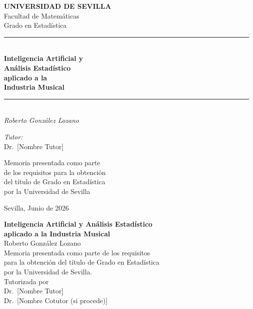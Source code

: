 \documentclass[12pt, a4paper, twoside]{book}
\theoremstyle{definition}
\begin{document}
\frontmatter

\begin{titlepage}
\centering
\vspace*{1.5cm}

{\large\bfseries UNIVERSIDAD DE SEVILLA}\\[0.3cm]
{\large Facultad de Matemáticas}\\[0.2cm]
{\large Grado en Estadística}\\[2cm]

\rule{\textwidth}{1.5pt}\\[0.5cm]
{\Huge\bfseries\color{azultfg}
Inteligencia Artificial y\\[0.3cm]
Análisis Estadístico\\[0.3cm]
aplicado a la\\[0.3cm]
Industria Musical}\\[0.4cm]
\rule{\textwidth}{1.5pt}\\[2cm]

{\Large\itshape Roberto González Lozano}\\[3cm]

\begin{minipage}{0.4\textwidth}
  \begin{flushleft}
    \emph{Tutor:}\\
    Dr.~[Nombre Tutor]
  \end{flushleft}
\end{minipage}
\hfill
\begin{minipage}{0.5\textwidth}
  \begin{flushright}
    Memoria presentada como parte\\
    de los requisitos para la obtención\\
    del título de Grado en Estadística\\
    por la Universidad de Sevilla
  \end{flushright}
\end{minipage}

\vfill
{\large Sevilla, Junio de 2026}
\end{titlepage}

\cleardoublepage

\begin{center}
\vspace*{2cm}
{\Large\bfseries\color{azultfg}
Inteligencia Artificial y Análisis Estadístico\\
aplicado a la Industria Musical}\\[1.5cm]
{\large Roberto González Lozano}\\[1cm]
{\normalsize
Memoria presentada como parte de los requisitos\\
para la obtención del título de Grado en Estadística\\
por la Universidad de Sevilla.}\\[1.5cm]
Tutorizada por\\[0.3cm]
{\normalsize Dr.~[Nombre Tutor]}\\[0.3cm]
{\normalsize Dr.~[Nombre Cotutor (si procede)]}
\end{center}
\end{document}
